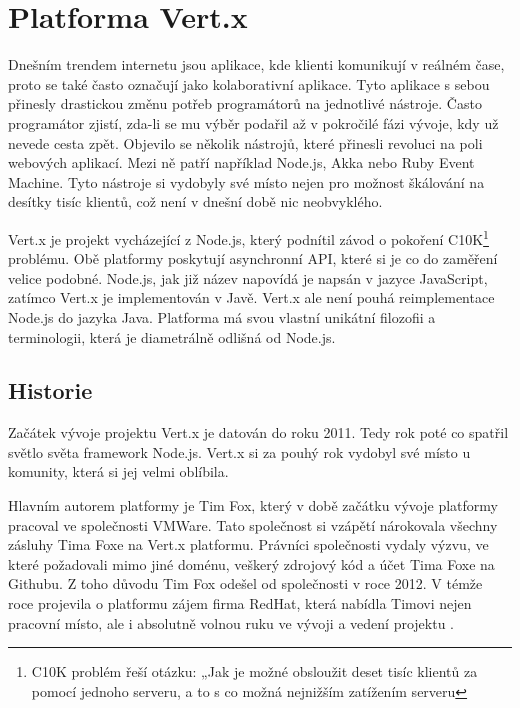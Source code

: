 
\chapter{Platforma Vert.x}

Dnešním trendem internetu jsou aplikace, kde klienti komunikují v reálném čase, proto se také často označují jako kolaborativní aplikace. Tyto aplikace s sebou přinesly drastickou změnu potřeb programátorů na jednotlivé nástroje. Často programátor zjistí, zda-li se mu výběr podařil až v pokročilé fázi vývoje, kdy už nevede cesta zpět. Objevilo se několik nástrojů, které přinesli revoluci na poli webových aplikací. Mezi ně patří například Node.js, Akka nebo Ruby Event Machine. 
Tyto nástroje si vydobyly své místo nejen pro možnost škálování na desítky tisíc klientů, což není v dnešní době nic neobvyklého. 

Vert.x je projekt vycházející z Node.js, který podnítil závod o pokoření C10K\footnote{C10K problém řeší otázku: „Jak je možné obsloužit deset tisíc klientů za pomocí jednoho serveru, a to s co možná nejnižším zatížením serveru} problému. Obě platformy poskytují asynchronní API, které si je co do zaměření velice podobné. Node.js, jak již název napovídá je napsán v jazyce JavaScript, zatímco Vert.x je implementován v Javě. Vert.x ale není pouhá reimplementace Node.js do jazyka Java. Platforma má svou vlastní unikátní filozofii a terminologii, která je diametrálně odlišná od Node.js.

\section{Historie}

Začátek vývoje projektu Vert.x je datován do roku 2011. Tedy rok poté co spatřil světlo světa framework Node.js. Vert.x si za pouhý rok vydobyl své místo u komunity, která si jej velmi oblíbila. 

Hlavním autorem platformy je Tim Fox, který v době začátku vývoje platformy pracoval ve společnosti VMWare. Tato společnost si vzápětí nárokovala všechny zásluhy Tima Foxe na Vert.x platformu. Právníci společnosti vydaly výzvu, ve které požadovali mimo jiné doménu, veškerý zdrojový kód a účet Tima Foxe na Githubu. Z toho důvodu Tim Fox odešel od společnosti v roce 2012. V témže roce projevila o platformu zájem firma RedHat, která nabídla Timovi nejen pracovní místo, ale i absolutně volnou ruku ve vývoji a vedení projektu \cite{whoControlVertx}. 

